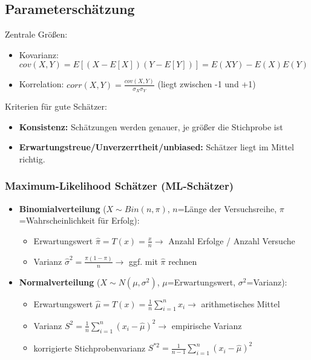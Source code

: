 \subsection{Parameterschätzung}

Zentrale Größen:
\begin{itemize}
    \item Kovarianz: \(cov(X,Y)=E[(X-E[X])(Y-E[Y])]=E(XY)-E(X)E(Y)\)
    \item Korrelation: \(corr(X,Y)=\frac{cov(X,Y)}{\sigma_X\sigma_Y}\) (liegt zwischen -1 und +1)
\end{itemize}

Kriterien für gute Schätzer:
\begin{itemize}
    \item \textbf{Konsistenz:} Schätzungen werden genauer, je größer die Stichprobe ist
    \item \textbf{Erwartungstreue/Unverzerrtheit/unbiased:} Schätzer liegt im Mittel richtig.
\end{itemize}

\subsubsection{Maximum-Likelihood Schätzer (ML-Schätzer)}

\begin{itemize}
    \item \textbf{Binomialverteilung} (\(X\sim Bin(n, \pi)\), \(n\)=Länge der Versuchsreihe, \(\pi\)=Wahrscheinlichkeit für Erfolg):
    \begin{itemize}
        \item Erwartungswert \(\hat{\pi}=T(x)=\frac{x}{n} \rightarrow \) Anzahl Erfolge / Anzahl Versuche
        \item Varianz \(\hat{\sigma}^2=\frac{\pi(1-\pi)}{n} \rightarrow \) ggf. mit \(\hat{\pi}\) rechnen
    \end{itemize}
    \item \textbf{Normalverteilung} (\(X\sim N(\mu, \sigma^2)\), \(\mu\)=Erwartungswert, \(\sigma^2\)=Varianz):
    \begin{itemize}
        \item Erwartungswert \(\hat{\mu}=T(x)=\frac{1}{n}\sum_{i=1}^{n}x_i \rightarrow \) arithmetisches Mittel
        \item Varianz \(S^2=\frac{1}{n}\sum_{i=1}^{n}(x_i-\hat{\mu})^2 \rightarrow \) empirische Varianz
        \item korrigierte Stichprobenvarianz \(S^{*2}=\frac{1}{n-1}\sum_{i=1}^{n}(x_i-\hat{\mu})^2 \)
    \end{itemize}
\end{itemize}

